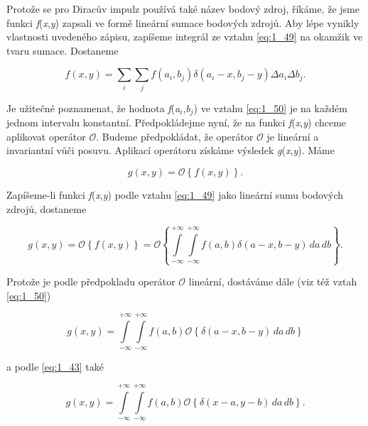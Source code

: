 Protože se pro Diracův impulz používá také název bodový zdroj, říkáme, že jsme funkci \textit{f}(\textit{x},\textit{y}) zapsali ve formě lineární sumace bodových zdrojů. Aby lépe vynikly vlastnosti uvedeného zápisu, zapíšeme integrál ze vztahu \eqref{eq:1_49} na okamžik ve tvaru sumace. Dostaneme

\begin{equation} \label{eq:1_50}
    f(x, y) = \sum\limits_{i} \sum\limits_{j} f(a_i, b_j) \delta(a_i-x, b_j-y) \Delta a_i \Delta b_j.
\end{equation}

Je užitečné poznamenat, že hodnota \textit{f}(\textit{a}$_i$,\textit{b}$_j$) ve vztahu \eqref{eq:1_50} je na každém jednom intervalu konstantní. Předpokládejme nyní, že na funkci \textit{f}(\textit{x},\textit{y}) chceme aplikovat operátor $\mathscr{O}$. Budeme předpokládat, že operátor $\mathscr{O}$ je lineární a invariantní vůči posuvu. Aplikací operátoru získáme výsledek  \textit{g}(\textit{x},\textit{y}). Máme 

\begin{equation} \label{eq:1_51}
    g(x, y) = \mathscr{O} \left\{ f(x, y) \right\}.
\end{equation}

Zapíšeme-li funkci \textit{f}(\textit{x},\textit{y}) podle vztahu \eqref{eq:1_49} jako lineární sumu bodových zdrojů, dostaneme

\begin{equation} \label{eq:1_52}
    g(x, y) = \mathscr{O} \left\{ f(x, y) \right\} = \mathscr{O} \left\{ \int\limits_{-\infty}^{+\infty} \int\limits_{-\infty}^{+\infty} f(a, b) \delta(a-x, b-y) \,da \,db \right\}.
\end{equation}

Protože je podle předpokladu operátor $\mathscr{O}$ lineární, dostáváme dále (viz též vztah \eqref{eq:1_50})

\begin{equation} \label{eq:1_53}
    g(x, y) = \int\limits_{-\infty}^{+\infty} \int\limits_{-\infty}^{+\infty} f(a, b) \mathscr{O} \left\{ \delta(a-x, b-y) \,da \,db \right\}
\end{equation}

\noindent a podle \eqref{eq:1_43} také

\begin{equation} \label{eq:1_54}
    g(x, y) = \int\limits_{-\infty}^{+\infty} \int\limits_{-\infty}^{+\infty} f(a, b) \mathcal{O} \left\{ \delta(x-a, y-b) \,da \,db \right\}.
\end{equation}

